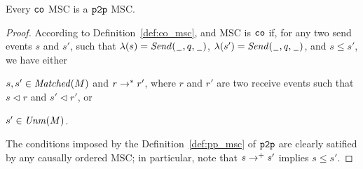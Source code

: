\begin{proposition} \label{prop:co_is_pp}
	Every $\mathtt{co}$ MSC is a $\mathtt{p2p}$ MSC.
\end{proposition}
\begin{proof}
	According to Definition~\ref{def:co_msc}, and MSC is $\mathtt{co}$ if, for any two send events $s$ and $s'$, such that $\lambda(s)={\mathit{Send}(\hspace{0.1em}\underline{\hspace{0.5em}}\hspace{0.1em},q,\hspace{0.1em}\underline{\hspace{0.5em}}\hspace{0.1em})}$, $\lambda(s')={\mathit{Send}(\hspace{0.1em}\underline{\hspace{0.5em}}\hspace{0.1em},q,\hspace{0.1em}\underline{\hspace{0.5em}}\hspace{0.1em})}$, and $s \le s'$, we have either
	\begin{enumerate*}[label={(\roman*)}]
		\item $s,s' \in \mathit{Matched}(M)$ and $r \to^* r'$, where $r$ and $r'$ are two receive events such that $s \lhd r$ and $s' \lhd r'$, or
		\item $s' \in \mathit{Unm}(M)$.
	\end{enumerate*}
	The conditions imposed by the Definition~\ref{def:pp_msc} of $\mathtt{p2p}$ are clearly satified by any causally ordered MSC; in particular, note that $s \to^+ s'$ implies $s \le s'$.
\end{proof}

